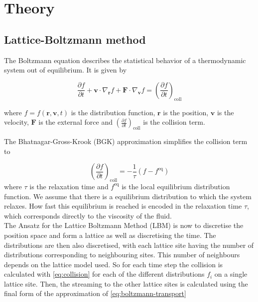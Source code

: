 \section{Theory}
\subsection{Lattice-Boltzmann method}
The Boltzmann equation describes the statistical behavior of a thermodynamic system out of equilibrium. It is given by

\begin{equation}\label{eq:boltzmann-transport}
\frac{\partial f}{\partial t} + \mathbf{v} \cdot \nabla_{\mathbf{r}} f + \mathbf{F} \cdot \nabla_{\mathbf{v}} f = \left( \frac{\partial f}{\partial t} \right)_{\text{coll}}
\end{equation}

where \( f = f(\mathbf{r}, \mathbf{v}, t) \) is the distribution function, \( \mathbf{r} \) is the position, \( \mathbf{v} \) is the velocity, \( \mathbf{F} \) is the external force and \( \left( \frac{\partial f}{\partial t} \right)_{\text{coll}} \) is the collision term.

The Bhatnagar-Gross-Krook (BGK) approximation simplifies the collision term to 

\begin{equation}\label{eq:collision}
\left( \frac{\partial f}{\partial t} \right)_{\text{coll}} = -\frac{1}{\tau} (f - f^{\text{eq}})
\end{equation}
where \( \tau \) is the relaxation time and \( f^{\text{eq}} \) is the local equilibrium distribution function. We assume that there is a equilibrium distribution to which the system relaxes. How fast this equilibrium is reached is encoded in the relaxation time $\tau$, which corresponds directly to the viscosity of the fluid.\\

The Ansatz for the Lattice Boltzmann Method (LBM) is now to discretise the position space and form a lattice as well as discretising the time. The distributions are then also discretised, with each lattice site having the number of distributions corresponding to neighbouring sites. This number of neighbours depends on the lattice model used. So for each time step the collision is calculated with \autoref{eq:collision} for each of the different distributions $f_i$ on a single lattice site. Then, the streaming to the other lattice sites is calculated using the final form of the approximation of \autoref{eq:boltzmann-transport}

